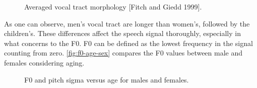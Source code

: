 \begin{figure}[!ht]
        \noindent{}
        \caption{Averaged vocal tract morphology [Fitch and Giedd 1999].}
        \label{fig:vocal-tract-morphology}
\end{figure}

As one can observe, men's vocal tract are longer than women's, followed by the children's. These differences 
affect the speech signal thoroughly, especially in what concerns to the \ac{F0}. \ac{F0} can be defined as the 
lowest frequency in the signal counting from zero. \autoref{fig:f0-age-sex} compares the \ac{F0} values
between male and females considering aging.

\begin{figure}[!ht]
        \noindent{}
        \caption{F0 and pitch sigma versus age for males and females.}
        \label{fig:f0-age-sex}
\end{figure}

